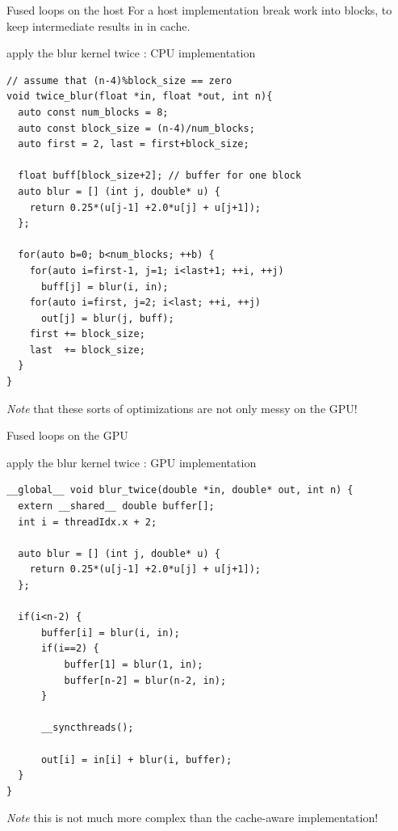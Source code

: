 \begin{frame}[fragile]{Fused loops on the host}
    For a host implementation break work into blocks, to keep intermediate results in  in cache.
    \begin{code}{apply the blur kernel twice : CPU implementation}
        \begin{lstlisting}[style=boxcudatiny]
// assume that (n-4)%block_size == zero
void twice_blur(float *in, float *out, int n){
  auto const num_blocks = 8;
  auto const block_size = (n-4)/num_blocks;
  auto first = 2, last = first+block_size;

  float buff[block_size+2]; // buffer for one block
  auto blur = [] (int j, double* u) {
    return 0.25*(u[j-1] +2.0*u[j] + u[j+1]);
  };

  for(auto b=0; b<num_blocks; ++b) {
    for(auto i=first-1, j=1; i<last+1; ++i, ++j)
      buff[j] = blur(i, in);
    for(auto i=first, j=2; i<last; ++i, ++j)
      out[j] = blur(j, buff);
    first += block_size;
    last  += block_size;
  }
}
        \end{lstlisting}
    \end{code}
    \emph{Note} that these sorts of optimizations are not only messy on the GPU!
\end{frame}

\begin{frame}[fragile]{Fused loops on the GPU}
    \begin{code}{apply the blur kernel twice : GPU implementation}
        \begin{lstlisting}[style=boxcudatiny]
__global__ void blur_twice(double *in, double* out, int n) {
  extern __shared__ double buffer[];
  int i = threadIdx.x + 2;

  auto blur = [] (int j, double* u) {
    return 0.25*(u[j-1] +2.0*u[j] + u[j+1]);
  };

  if(i<n-2) {
      buffer[i] = blur(i, in);
      if(i==2) {
          buffer[1] = blur(1, in);
          buffer[n-2] = blur(n-2, in);
      }

      __syncthreads();

      out[i] = in[i] + blur(i, buffer);
  }
}
        \end{lstlisting}
    \end{code}
    \emph{Note} this is not much more complex than the cache-aware implementation!
\end{frame}

